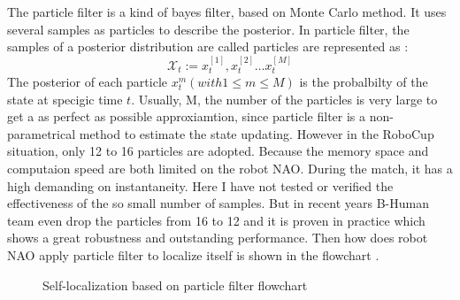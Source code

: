 The particle filter is a kind of bayes filter, based on Monte Carlo method. It uses several samples as particles to describe the posterior. In particle filter, the samples of a posterior distribution are called particles are represented as \cite{thrun2005probabilistic}: 
\[
\mathcal{X}_t:=x_t^{[1]},x_t^{[2]} \dots x_t^{[M]}
\]
The posterior of each particle $x_t^{m} (with 1 \leq m \leq M)$ is the probalbilty of the state at specigic time $t$. Usually, M, the number of the particles is very large to get a as perfect as possible approxiamtion, since particle filter is a non-parametrical method to estimate the state updating. However in the RoboCup situation, only 12 to 16 particles are adopted. Because the memory space and computaion speed are both limited on the robot NAO. During the match, it has a high demanding on instantaneity. Here I have not tested or verified the effectiveness of the so small number of samples. But in recent years B-Human team even drop the particles from 16 to 12 \cite{BHumanCodeRelease2010} and it is proven in practice which shows a great robustness and outstanding performance. Then how does robot NAO apply particle filter to localize itself is shown in the flowchart .
\begin{figure}[tbp]
\centering
{}
\caption{Self-localization based on particle filter flowchart}
\label{ffc}
\end{figure}

